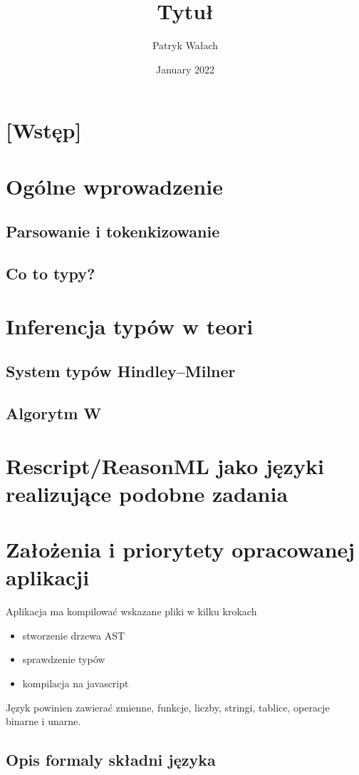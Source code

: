 \documentclass{article}
\title{Tytuł}
\author{Patryk Wałach}
\date{January 2022}
\begin{document}
\maketitle

\section{[Wstęp]}

\section{Ogólne wprowadzenie}
\subsection{Parsowanie i tokenkizowanie}
\subsection{Co to typy?}
\section{Inferencja typów w teori}
\subsection{System typów Hindley–Milner}
\subsection{Algorytm W}
\section{Rescript/ReasonML jako języki realizujące podobne zadania}
\section{Założenia i priorytety opracowanej aplikacji}
Aplikacja ma kompilować wskazane pliki w kilku krokach
\begin{itemize}
    \item stworzenie drzewa AST
    \item sprawdzenie typów
    \item kompilacja na javascript
\end{itemize}
Język powinien zawierać zmienne, funkcje, liczby, stringi, tablice, operacje binarne i unarne.
\subsection{Opis formaly składni języka}
\end{document}
